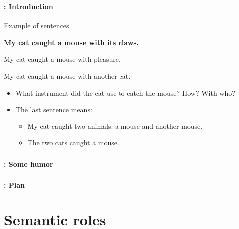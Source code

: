 \documentclass[xcolor=table]{beamer}
\subtitle[08- Sentence semantics]{Chapter 08\\Sentence semantics}
\begin{document}
	
\begin{frame}
	\frametitle{\inserttitle}
	\framesubtitle{\insertshortsubtitle: Introduction}

	\begin{exampleblock}{Example of sentences}
		\begin{center}
			\Large\bfseries
			My cat caught a mouse with its claws.
			
			My cat caught a mouse with pleasure.
			
			My cat caught a mouse with another cat.
		\end{center}
	\end{exampleblock}
	
	\begin{itemize}
		\item What instrument did the cat use to catch the mouse? How? With who?
		\item The last sentence means: 
		\begin{itemize}
			\item My cat caught two animals: a mouse and another mouse.
			\item The two cats caught a mouse.
		\end{itemize}
	\end{itemize}

\end{frame}

\begin{frame}
	\frametitle{\inserttitle}
	\framesubtitle{\insertshortsubtitle: Some humor}
	
	\begin{center}
	\end{center}
	
\end{frame}

\begin{frame}
	\frametitle{\inserttitle}
	\framesubtitle{\insertshortsubtitle: Plan}

	\begin{multicols}{2}
	\tableofcontents
	\end{multicols}

\end{frame}

\section{Semantic roles}
\end{document}
